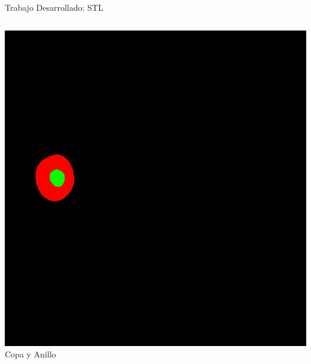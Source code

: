 \documentclass[xcolor=dvipsnames,table]{beamer}
\begin{document}
\begin{frame}{Trabajo Desarrollado: STL}
\begin{columns}[T]
\begin{minipage}[t]{0.35\textwidth}
		\includegraphics[width=\textwidth]{my_images/ML/hard.jpg}\\[1ex]
		{\small Copa y Anillo}
	\end{minipage}\hfill

	\end{columns}
\end{frame}
\end{document}
